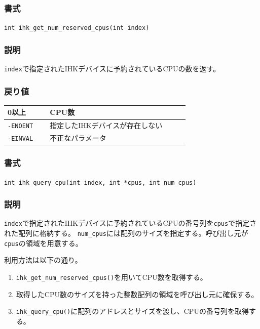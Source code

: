 \documentclass[twoside,11pt,fleqn]{book}
\begin{document}
\subsubsection{}
\subsubsection*{書式}{\quad} \texttt{int ihk\_get\_num\_reserved\_cpus(int index)}
\subsubsection*{説明}{\quad} \texttt{index}で指定されたIHKデバイスに予約されているCPUの数を返す。

\subsubsection*{戻り値}{\quad}
\begin{table}[!h]
\footnotesize
\begin{tabular}{|p{0.20\linewidth}|p{0.66\linewidth}|} \hline
0以上&CPU数\\ \hline
\texttt{-ENOENT}&指定したIHKデバイスが存在しない\\ \hline
\texttt{-EINVAL}&不正なパラメータ\\ \hline
\end{tabular}
\vspace{-0em}
\end{table}
\FloatBarrier

\subsubsection{}
\subsubsection*{書式}{\quad} \texttt{int ihk\_query\_cpu(int index, int *cpus, int num\_cpus)}
\subsubsection*{説明}{\quad} \texttt{index}で指定されたIHKデバイスに予約されているCPUの番号列を\texttt{cpus}で指定された配列に格納する。 \texttt{num\_cpus}には配列のサイズを指定する。呼び出し元が\texttt{cpus}の領域を用意する。

利用方法は以下の通り。
\begin{enumerate}
\item \texttt{ihk\_get\_num\_reserved\_cpus()}を用いてCPU数を取得する。
\item 取得したCPU数のサイズを持った整数配列の領域を呼び出し元に確保する。
\item \texttt{ihk\_query\_cpu()}に配列のアドレスとサイズを渡し、CPUの番号列を取得する。
\end{enumerate}
\end{document}
